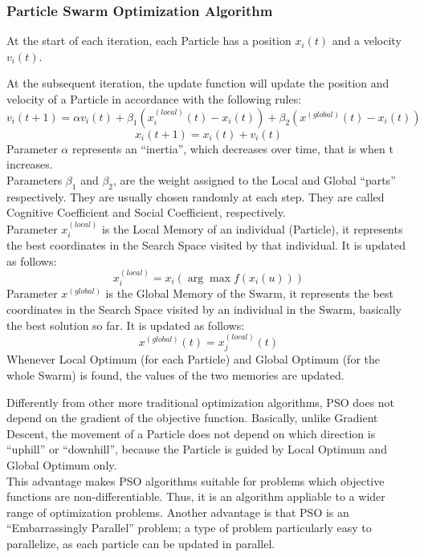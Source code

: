 \subsubsection{Particle Swarm Optimization Algorithm}

At the start of each iteration, each Particle has a position $x_i(t)$ and a velocity $v_i(t)$.

\label{sec:UpdateOfParticles-3.1.1}
At the subsequent iteration, the update function will update the position and velocity of a Particle in accordance with the following rules:
\begin{equation}
	v_i(t+1) = \alpha v_i(t) + \beta_1(x_i^{(local)}(t) - x_i(t)) + \beta_2(x^{(global)}(t) - x_i(t))
\end{equation}
\begin{equation}
	x_i(t+1) = x_i(t) + v_i(t)
\end{equation}
Parameter $\alpha$ represents an “inertia”, which decreases over time, that is when t increases.
\\[0.3cm]Parameters $\beta_1$ and $\beta_2$, are the weight assigned to the Local and Global “parts” respectively. They are usually chosen randomly at each step. They are called Cognitive Coefficient and Social Coefficient, respectively.
\\[0.3cm]Parameter  $x_i^{(local)}$  is the Local Memory of an individual (Particle), it represents the best coordinates in the Search Space visited by that individual. It is updated as follows:
\begin{equation}
	x_i^{(local)} = x_i(\arg \max f(x_i(u)))
\end{equation}
Parameter $x^{(global)}$ is the Global Memory of the Swarm, it represents the best coordinates in the Search Space visited by an individual in the Swarm, basically the best solution so far. It is updated as follows:
\begin{equation}
	x^{(global)}(t) = x_j^{(local)}(t)
\end{equation}
Whenever Local Optimum (for each Particle) and Global Optimum (for the whole Swarm) is found, the values of the two memories are updated.

Differently from other more traditional optimization algorithms, PSO does not depend on the gradient of the objective function.
Basically, unlike Gradient Descent, the movement of a Particle does not depend on which direction is “uphill” or “downhill”, because the Particle is guided by Local Optimum and Global Optimum only.
\\[0.3cm]This advantage makes PSO algorithms suitable for problems which objective functions are non-differentiable. Thus, it is an algorithm appliable to a wider range of optimization problems.
Another advantage is that PSO is an “Embarrassingly Parallel” problem; a type of problem particularly easy to parallelize, as each particle can be updated in parallel.

